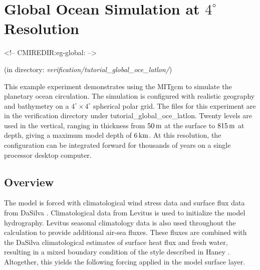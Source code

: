 
\section[Global Ocean MITgcm Example]{Global Ocean Simulation at $4^\circ$ Resolution}
\label{www:tutorials}
\label{sect:eg-global}
\begin{rawhtml}
<!-- CMIREDIR:eg-global: -->
\end{rawhtml}
\begin{center}
(in directory: {\it verification/tutorial\_global\_oce\_latlon/})
\end{center}


%
%


This example experiment demonstrates using the MITgcm to simulate
the planetary ocean circulation. The simulation is configured
with realistic geography and bathymetry on a
$4^{\circ} \times 4^{\circ}$ spherical polar grid.
The files for this experiment are in the verification directory
under tutorial\_global\_oce\_latlon.
Twenty levels are used in the vertical, ranging in thickness
from $50\,{\rm m}$ at the surface to $815\,{\rm m}$ at depth,
giving a maximum model depth of $6\,{\rm km}$.
At this resolution, the configuration
can be integrated forward for thousands of years on a single 
processor desktop computer.
\\
\subsection{Overview}
\label{www:tutorials}

The model is forced with climatological wind stress data and surface
flux data from DaSilva \cite{DaSilva94}. Climatological data
from Levitus \cite{Levitus94} is used to initialize the model hydrography.
Levitus seasonal climatology data is also used throughout the calculation
to provide additional air-sea fluxes.
These fluxes are combined with the DaSilva climatological estimates of
surface heat flux and fresh water, resulting in a mixed boundary
condition of the style described in Haney \cite{Haney}.
Altogether, this yields the following forcing applied
in the model surface layer.

